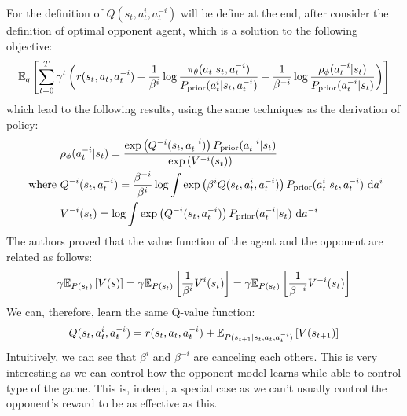 For the definition of $Q(s_t, a^i_t, a^{-i}_t)$ will be define at the end, after consider the definition of optimal opponent agent, which is a solution to the following objective:
\begin{equation}
    \mathbb{E}_q\left[ \sum^T_{t=0} \gamma^t \left( r(s_t, a_t, a^{-i}_t) - \frac{1}{\beta^i} \log\frac{\pi_{\theta}(a_t|s_t, a^{-i}_t)}{P_{\text{prior}}(a^i_t|s_t, a^{-i}_t)} - \frac{1}{\beta^{-i}}\log \frac{\rho_\phi(a^{-i}_t | s_t)}{P_{\text{prior}}(a^{-i}_t | s_t)} \right) \right]
\end{equation}
which lead to the following results, using the same techniques as the derivation of policy:
\begin{equation}
\begin{aligned}
    &\rho_{\phi}(a^{-i}_t|s_t) = \frac{ \exp\left( Q^{-i}(s_t, a^{-i}_t) \right)P_{\text{prior}}(a^{-i}_t|s_t)} {\exp\left( V^{-i}(s_t) \right)} \\
    \text{ where }&Q^{-i}(s_t, a^{-i}_t) = \frac{\beta^{-i}}{\beta^{i}} \log \int \exp\left( \beta^{i} Q(s_t, a^i_t, a^{-i}_t) \right) P_{\text{prior}}(a^{i}_t|s_t, a^{-i}_t) \ \mathrm{d} a^{i}  \\
    &V^{-i}(s_t) = \log \int \exp\left( Q^{-i}(s_t, a^{-i}_t) \right)P_{\text{prior}}(a^{-i}_t|s_t) \ \mathrm{d} a^{-i}  \\
\end{aligned}
\end{equation}
The authors \cite{grau2018balancing} proved that the value function of the agent and the opponent are related as follows:
\begin{equation}
\label{eqn:chap3-balance-value-equivalent}
    \gamma\mathbb{E}_{P(s_t)}\left[ V(s) \right] = \gamma \mathbb{E}_{P(s_t)}\left[ \frac{1}{\beta^i} V^i(s_t) \right] = \gamma\mathbb{E}_{P(s_t)}\left[ \frac{1}{\beta^{-i}} V^{-i}(s_t) \right]
\end{equation}
We can, therefore, learn the same Q-value function:
\begin{equation}
    Q(s_t, a^i_t, a^{-i}_t) = r(s_t, a_t, a^{-i}_t) + \mathbb{E}_{P(s_{t+1} | s_t, a_t, a^{-i}_t)}\left[ V(s_{t+1}) \right]
\end{equation}
Intuitively, we can see that $\beta^i$ and $\beta^{-i}$ are canceling each others. This is very interesting as we can control how the opponent model learns while able to control  type of the game. This is, indeed, a special case as we can't usually control the opponent's reward to be as effective as this. 

